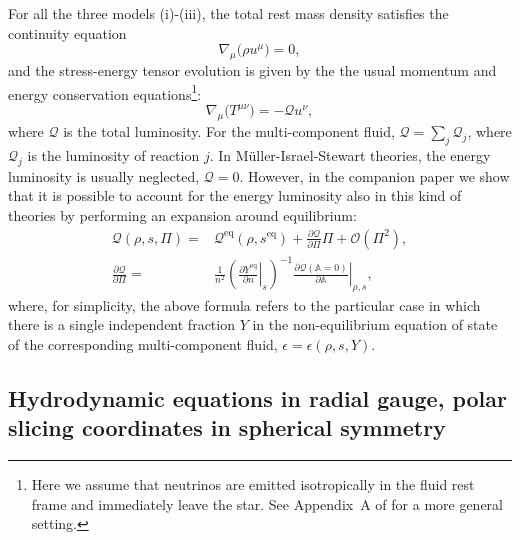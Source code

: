 \documentclass[aps,prd,twocolumn,a4paper,floatfix,nofootbib,superscriptaddress,nofootinbib]{revtex4}
\newcommand{\req}{\mathrm{eq}}
\begin{document}
For all the three models (i)-(iii), the total rest mass density satisfies the continuity equation
%
\begin{equation}
\label{eq:continuity}
\nabla_\mu \big( \rho u^\mu \big) =0,
\end{equation}
%
and the stress-energy tensor evolution is given by the
the usual momentum and energy conservation equations\footnote{Here we
assume that neutrinos are emitted isotropically in the fluid rest frame and
immediately leave the star. See Appendix~A of \citet{OConnor10} for a more
general setting.}:
%
\begin{equation}
\label{eq:conservation}
\nabla_\mu\big( T^{\mu \nu}\big)=-\mathcal Q u^\nu,
\end{equation}
%
where $\mathcal Q$ is the total luminosity.
For the multi-component fluid, $\mathcal Q=\sum_j\mathcal Q_j$,
where $\mathcal Q_j$ is the luminosity of reaction $j$.
In M\"uller-Israel-Stewart theories, the energy luminosity
is usually neglected, $\mathcal Q=0$. However, in the companion paper \cite{Camelio22a} we show
that it is possible to account for the energy luminosity
also in this kind of theories by performing an expansion around equilibrium:
%
\begin{align}
\label{eq:q}
\mathcal Q(\rho,s,\Pi)={}&\mathcal Q^\req(\rho,s^\req)
+\frac{\partial \mathcal Q}{\partial \Pi}\Pi + \mathcal O(\Pi^2),\\
\label{eq:dqdpi}
\frac{\partial \mathcal Q}{\partial \Pi}={}&
\frac1{n^2}\left(\left.\frac{\partial Y^\req}{\partial n}\right|_s\right)^{-1}
\left.\frac{\partial \mathcal Q(\mathbb A=0)}{\partial \mathbb A}\right|_{\rho,s},
\end{align}
%
where, for simplicity, the above formula refers to the particular case in which
there is a single independent fraction $Y$ in the non-equilibrium equation of
state of the corresponding multi-component fluid, $\epsilon = \epsilon(\rho, s,
Y)$.

\subsection{Hydrodynamic equations in radial gauge, polar slicing coordinates in spherical symmetry}
\label{ssec:hydro}
\end{document}
